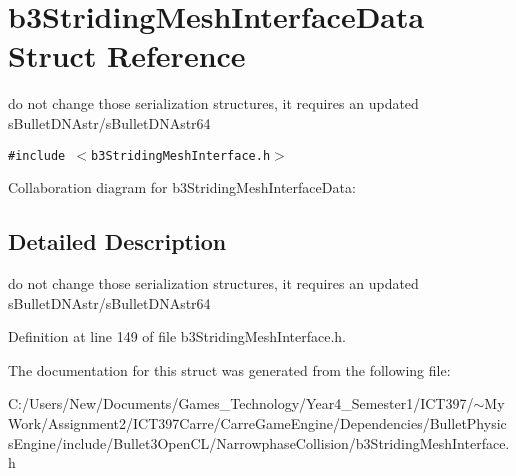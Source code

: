 \hypertarget{structb3_striding_mesh_interface_data}{
\section{b3StridingMeshInterfaceData Struct Reference}
\label{structb3_striding_mesh_interface_data}
}
do not change those serialization structures, it requires an updated sBulletDNAstr/sBulletDNAstr64  


{\tt \#include $<$b3StridingMeshInterface.h$>$}

Collaboration diagram for b3StridingMeshInterfaceData:

\subsection{Detailed Description}
do not change those serialization structures, it requires an updated sBulletDNAstr/sBulletDNAstr64 

Definition at line 149 of file b3StridingMeshInterface.h.

The documentation for this struct was generated from the following file:\begin{CompactItemize}
\item 
C:/Users/New/Documents/Games\_\-Technology/Year4\_\-Semester1/ICT397/$\sim$My Work/Assignment2/ICT397Carre/CarreGameEngine/Dependencies/BulletPhysicsEngine/include/Bullet3OpenCL/NarrowphaseCollision/b3StridingMeshInterface.h\end{CompactItemize}
